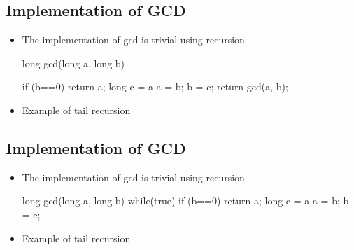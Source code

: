 
\begin{slide}
\section{Implementation of GCD}

\begin{itemize}
  \item The implementation of gcd is trivial using recursion
    \begin{java}
      long gcd(long a, long b)
      {

           if (b==0) {
              return a;
           }
           long c = a%
           a = b;
           b = c;
           return gcd(a, b);
      }
    \end{java}
  \item Example of tail recursion
\end{itemize}

\end{slide}


\begin{slide}
\section{Implementation of GCD}

\begin{itemize}
  \item The implementation of gcd is trivial using recursion
    \begin{java}
      long gcd(long a, long b)
      {
        while(true) {
           if (b==0) {
              return a;
           }
           long c = a%
           a = b;
           b = c;
         }
      }
    \end{java}
  \item Example of tail recursion
\end{itemize}

\end{slide}




